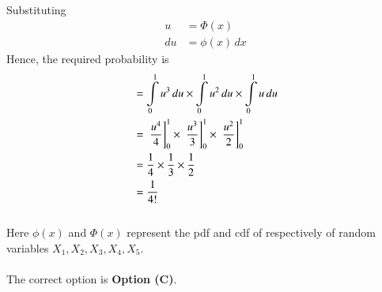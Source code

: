 \documentclass[journal,12pt,twocolumn]{IEEEtran}
\begin{document}
Substituting 
\begin{align}
    u &= \Phi(x) \\
    du &= \phi(x) \, dx 
\end{align}
Hence, the required probability is 
\begin{align}
     &= \int\limits_0^1 u^3 \, du \times \int\limits_0^1 u^2 \, du \times \int \limits_0^1 u\,du \\
     &= {}\left.\frac{u^4}{4}\right]_0^1 \times {}\left.\frac{u^3}{3}\right]_0^1 \times {}\left.\frac{u^2}{2}\right]_0^1 \\
     &= \frac{1}{4}\times \frac{1}{3} \times \frac{1}{2} \\ 
     &= \frac{1}{4!}
\end{align}
\\Here $\phi(x)$ and $\Phi(x)$ represent the pdf and cdf of  respectively of random variables $X_1, X_2, X_3, X_4, X_5$.
\\
\\The correct option is \textbf{Option (C)}.
\end{document}
